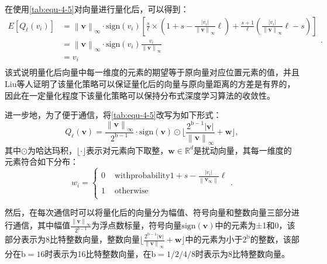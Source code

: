 在使用\autoref{tab:equ-4-5}对向量进行量化后，可以得到：
\begin{equation}
    \label{tab:equ-4-7}
    \begin{aligned}
        E\left[ Q_{\ell}\left( v_i \right) \right] &=\left\| \boldsymbol{v} \right\| _{\infty}\cdot \mathrm{sign}\left( v_i \right) \left[ \frac{s}{\ell}\times \left( 1+s-\frac{\left| v_i \right|}{\left\| \boldsymbol{v} \right\| _{\infty}}\ell \right) +\frac{s+1}{\ell}\left( \frac{\left| v_i \right|}{\left\| \boldsymbol{v} \right\| _{\infty}}\ell -s \right) \right]\\
        &=\left\| \boldsymbol{v} \right\| _{\infty}\cdot \mathrm{sign}\left( v_i \right) \frac{v_i}{\left\| \boldsymbol{v} \right\| _{\infty}}\\
        &=v_i\\
    \end{aligned}.
\end{equation}
该式说明量化后向量中每一维度的元素的期望等于原向量对应位置元素的值，并且Liu等人\cite{liu2020linear}证明了该量化策略可以保证量化后的向量与原向量距离的方差是有界的，因此在一定量化程度下该量化策略可以保持分布式深度学习算法的收敛性。

进一步地，为了便于通信，将\autoref{tab:equ-4-5}改写为如下形式：
\begin{equation}
    \label{tab:equ-4-8}
    Q_{\ell}\left( \boldsymbol{v} \right) =\frac{\left\| \boldsymbol{v} \right\| _{\infty}}{2^{\mathrm{b}-1}}\cdot \mathrm{sign}\left( \boldsymbol{v} \right) \odot \lfloor \frac{2^{\mathrm{b}-1}\left| \boldsymbol{v} \right|}{\left\| \boldsymbol{v} \right\| _{\infty}}+\boldsymbol{w} \rfloor ,
\end{equation}
其中$\odot$为哈达玛积，$\lfloor \cdot \rfloor $表示对元素向下取整，$\boldsymbol{w}\in \mathbb{R} ^d$是扰动向量，其每一维度的元素符合如下分布：
\begin{equation}
    \label{tab:equ-4-9}
    w_i=\begin{cases}
        0&		\,\,\mathrm{with} \mathrm{probability} 1+s-\frac{\left| v_i \right|}{\left\| \boldsymbol{v}_{\infty} \right\|}\ell\\
        1&		\,\,\mathrm{otherwise}\\
    \end{cases}.
\end{equation}

然后，在每次通信时可以将量化后的向量分为幅值、符号向量和整数向量三部分进行通信，其中幅值$\frac{\left\| \boldsymbol{v} \right\| _{\infty}}{2^{b-1}}$为浮点数标量，符号向量$\mathrm{sign}\left( \boldsymbol{v} \right)$中的元素为±1和0，该部分表示为8比特整数向量，整数向量$\lfloor \frac{2^{\mathrm{b}-1}\left| \boldsymbol{v} \right|}{\left\| \boldsymbol{v} \right\| _{\infty}}+\boldsymbol{w} \rfloor$中的元素为小于$2^\mathrm{b}$的整数，该部分在$\mathrm{b}=16$时表示为16比特整数向量，在$\mathrm{b}=1/2/4/8$时表示为8比特整数向量。

